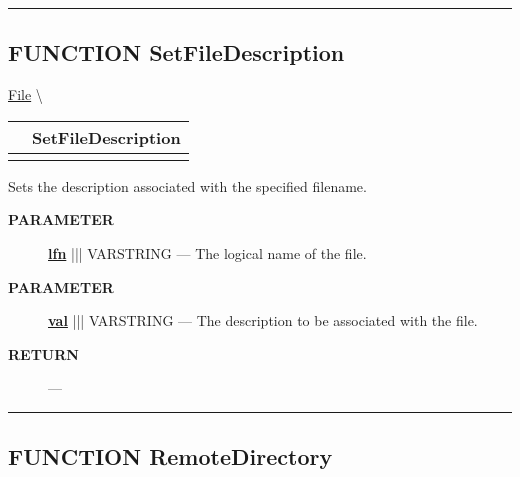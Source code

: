 \rule{\linewidth}{0.5pt}
\subsection*{\textsf{\colorbox{headtoc}{\color{white} FUNCTION}
SetFileDescription}}

\hypertarget{ecldoc:file.setfiledescription}{}
\hspace{0pt} \hyperlink{ecldoc:File}{File} \textbackslash 

{\renewcommand{\arraystretch}{1.5}
\begin{tabularx}{\textwidth}{|>{\raggedright\arraybackslash}l|X|}
\hline
\hspace{0pt}\mytexttt{\color{red} } & \textbf{SetFileDescription} \\
\hline
\multicolumn{2}{|>{\raggedright\arraybackslash}X|}{\hspace{0pt}\mytexttt{\color{param} (varstring lfn, varstring val)}} \\
\hline
\end{tabularx}
}

\par





Sets the description associated with the specified filename.






\par
\begin{description}
\item [\colorbox{tagtype}{\color{white} \textbf{\textsf{PARAMETER}}}] \textbf{\underline{lfn}} ||| VARSTRING --- The logical name of the file.
\item [\colorbox{tagtype}{\color{white} \textbf{\textsf{PARAMETER}}}] \textbf{\underline{val}} ||| VARSTRING --- The description to be associated with the file.
\end{description}







\par
\begin{description}
\item [\colorbox{tagtype}{\color{white} \textbf{\textsf{RETURN}}}] \textbf{} --- 
\end{description}




\rule{\linewidth}{0.5pt}
\subsection*{\textsf{\colorbox{headtoc}{\color{white} FUNCTION}
RemoteDirectory}}

